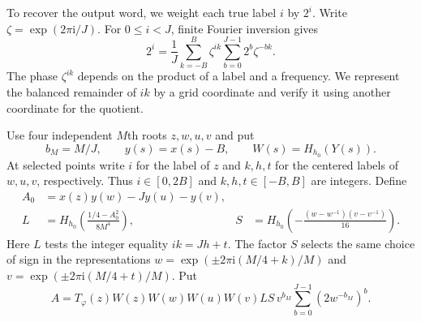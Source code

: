 \documentclass[11pt,letterpaper]{article}
\numberwithin{equation}{section}
\begin{document}
To recover the output word, we weight each true label $i$ by $2^i$.
Write $\zeta=\exp(2\pi\mathrm i/J)$. For $0\le i<J$, finite Fourier inversion gives
\begin{equation}\label{eq:weight-identity}
  2^i=\frac1J\sum_{k=-B}^{B}\zeta^{ik}
                 \sum_{b=0}^{J-1}2^b\zeta^{-bk}.
\end{equation}
The phase $\zeta^{ik}$ depends on the product of a label and a frequency.
We represent the balanced remainder of $ik$ by a grid coordinate and
verify it using another coordinate for the quotient.

Use four independent $M$th roots $z,w,u,v$ and put
\[
 b_M=M/J,\qquad y(s)=x(s)-B,\qquad W(s)=H_{h_0}(Y(s)).
\]
At selected points write $i$ for the label of $z$ and $k,h,t$ for the
centered labels of $w,u,v$, respectively. Thus $i\in[0,2B]$ and
$k,h,t\in[-B,B]$ are integers. Define
\begin{align*}
 A_0&=x(z)y(w)-J y(u)-y(v),\\
 L&=H_{h_0}\!\left(\frac{1/4-A_0^2}{8M^4}\right),&
 S&=H_{h_0}\!\left(-\frac{(w-w^{-1})(v-v^{-1})}{16}\right).
\end{align*}
Here $L$ tests the integer equality $ik=Jh+t$. The factor $S$ selects
the same choice of sign in the representations
$w=\exp(\pm2\pi\mathrm i(M/4+k)/M)$ and
$v=\exp(\pm2\pi\mathrm i(M/4+t)/M)$. Put
\begin{equation}\label{eq:fourier-kernel}
 A=T_\varphi(z)W(z)W(w)W(u)W(v)LS\,
     v^{b_M}\sum_{b=0}^{J-1}(2w^{-b_M})^b .
\end{equation}
\end{document}
